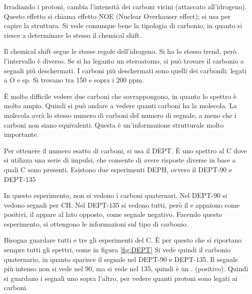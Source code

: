 
Irradiando i protoni, cambia l'intensità dei carboni vicini (attaccato
all'idrogeno).
Questo effetto si chiama effetto NOE (Nuclear Overhauser effect); si usa
per capire la struttura.
Si vede comunque bene la tipologia di carbonio, in quanto si riesce a
determinare lo stesso il chemical shift.


Il chemical shift segue le stesse regole dell'idrogeno. Si ha lo stesso
trend, però l'intervallo è diverso.
Se si ha leganto un eteroatomo, si può trovare il carbonio a segnali più
deschermati.
I carboni più deschermati sono quelli dei carbonili: legati a O e sp.
Si trovano tra 150 e sopra i 200 ppm.

È molto difficile vedere due carboni che sovrappongono, in quanto lo
spettro è molto ampio. Quindi si può andare a vedere quanti carboni ha
la molecola. La molecola avrà lo stesso numero di carboni del numero di
segnale, a meno che i carboni non siano equivalenti.
Questa è un'informazione strutturale molto importante.

Per ottenere il numero esatto di carboni, si usa il DEPT. È uno spettro
al C dove si utilizza una serie di impulsi, che consente di avere
risposte diverse in base a quali C sono presenti.
Esistono due esperimenti DEPH, ovvero il DEPT-90 e DEPT-135


In questo esperimento, non si vedono i carboni quaternari. Nel DEPT-90
si vedono segnali per CH. Nel DEPT-135 si vedono tutti, però il  e 
appaiono come positivi, il  appare al lato opposto, come segnale
negativo.
Facendo questo esperimento, si ottengono le informazioni sul tipo di
carbonio.

Bisogna guardare tutti e tre gli esperimenti del C. È per questo che si riportano sempre tutti gli spettri, come in figura \ref{fig:DEPT}
Si vede quindi il carbonio quaternario, in quanto sparisce il segnale
nel DEPT-90 e DEPT-135.
Il segnale più intenso non si vede nel 90, ma si vede nel 135, quindi è un .
(positivo).
Quindi si guardano i segnali uno sopra l'altro, per vedere quanti
protoni sono legati ai carboni.

